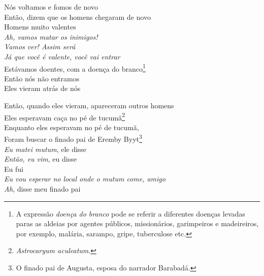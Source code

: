 \begin{linenumbers}\begingroup\raggedright
 
\noindent   Nós voltamos e fomos de novo\\
  Então, dizem que os homens chegaram de novo\\
  Homens muito valentes\\
  \emph{Ah, vamos matar os inimigos!}\\
  \emph{Vamos ver! Assim será}\\
  \emph{Já que você é valente, você vai entrar}\\
  Estávamos doentes, com a doença do branco\footnote{A expressão
   \emph{doença do branco} pode se referir a diferentes doenças levadas
   paras as aldeias por agentes públicos, missionários, garimpeiros e
   madeireiros, por exemplo, malária, sarampo, gripe, tuberculose etc.}\\
  Então nós não entramos\\
  Eles vieram atrás de nós
 
\end{linenumbers}\endgroup

\bigskip

\begin{linenumbers}\begingroup\raggedright
 
\noindent   Então, quando eles vieram, apareceram outros homens\\
  Eles esperavam caça no pé de tucumã\footnote{\emph{Astrocaryum
   aculeatum}.}\\
  Enquanto eles esperavam no pé de tucumã,\\
  Foram buscar o finado pai de Eremby Byyt\footnote{O finado pai de
   Augusta, esposa do narrador Barabadá.}\\
  \emph{Eu matei mutum}, ele disse\\
  \emph{Então, eu vim}, eu disse\\
  Eu fui\\
  \emph{Eu vou esperar no local onde o mutum come, amigo}\\
  \emph{Ah}, disse meu finado pai
 
\end{linenumbers}\endgroup

